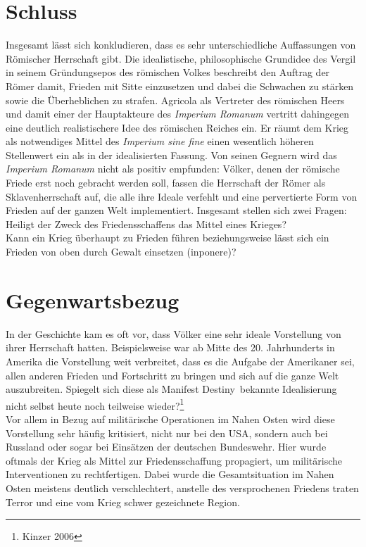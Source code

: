 \documentclass[12pt]{article}
\begin{document}
	\section{Schluss}
	Insgesamt lässt sich konkludieren, dass es sehr unterschiedliche Auffassungen von Römischer Herrschaft gibt. Die idealistische, philosophische Grundidee des Vergil in seinem Gründungsepos des römischen Volkes beschreibt den Auftrag der Römer damit, Frieden mit Sitte einzusetzen und dabei die Schwachen zu stärken sowie die Überheblichen zu strafen. Agricola als Vertreter des römischen Heers und damit einer der Hauptakteure des \textit{Imperium Romanum} vertritt dahingegen eine deutlich realistischere Idee des römischen Reiches ein. Er räumt dem Krieg als notwendiges Mittel des \textit{Imperium sine fine} einen wesentlich höheren Stellenwert ein als in der idealisierten Fassung.  
	Von seinen Gegnern wird das \textit{Imperium Romanum} nicht als positiv empfunden: Völker, denen der römische Friede erst noch gebracht werden soll, fassen die Herrschaft der Römer als Sklavenherrschaft auf, die alle ihre Ideale verfehlt und eine pervertierte Form von Frieden auf der ganzen Welt implementiert.
	Insgesamt stellen sich zwei Fragen:\\
	Heiligt der Zweck des Friedensschaffens das Mittel eines Krieges?\\
	Kann ein Krieg überhaupt zu Frieden führen beziehungsweise lässt sich ein Frieden von oben durch Gewalt einsetzen (\glqq inponere\grqq)?
	\section{Gegenwartsbezug}
	In der Geschichte kam es oft vor, dass Völker eine sehr ideale Vorstellung von ihrer Herrschaft hatten. Beispielsweise war ab Mitte des 20. Jahrhunderts in Amerika die Vorstellung weit verbreitet, dass es die Aufgabe der Amerikaner sei, allen anderen Frieden und Fortschritt zu bringen und sich auf die ganze Welt auszubreiten. Spiegelt sich diese als \glqq Manifest Destiny\grqq\ bekannte Idealisierung nicht selbst heute noch teilweise wieder?\footnote{Kinzer 2006}\\
	Vor allem in Bezug auf militärische Operationen im Nahen Osten wird diese Vorstellung sehr häufig kritisiert, nicht nur bei den USA, sondern auch bei Russland oder sogar bei Einsätzen der deutschen Bundeswehr. Hier wurde oftmals der Krieg als Mittel zur Friedensschaffung propagiert, um militärische Interventionen zu rechtfertigen.
	Dabei wurde die Gesamtsituation im Nahen Osten meistens deutlich verschlechtert, anstelle des versprochenen Friedens traten Terror und eine vom Krieg schwer gezeichnete Region.
	
\end{document}
